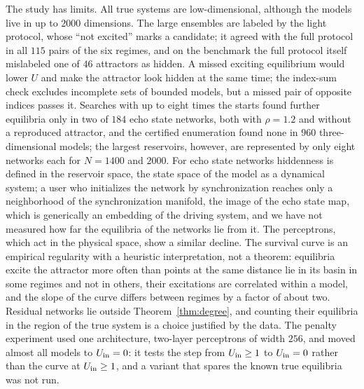 The study has limits. All true systems are low-dimensional, although the models live in up to $2000$ dimensions. The large
ensembles are labeled by the light protocol, whose ``not excited'' marks a candidate; it agreed with the full protocol in all $115$
pairs of the six regimes, and on the benchmark the full protocol itself mislabeled one of $46$ attractors as hidden. A missed exciting
equilibrium would lower $U$ and make the attractor look hidden at the same time; the index-sum check excludes incomplete sets
of bounded models, but a missed pair of opposite indices passes it. Searches with up to eight times the starts found
further equilibria only in two of $184$ echo state networks, both with $\rho=1.2$ and without a reproduced attractor, and
the certified enumeration found none in $960$ three-dimensional models; the largest reservoirs, however, are represented by only eight networks each for $N=1400$
and $2000$. For echo state networks hiddenness is defined in the
reservoir space, the state space of the model as a dynamical system; a user who initializes the network by synchronization
reaches only a neighborhood of the synchronization manifold, the image of the echo state map, which is generically an
embedding of the driving system,\cite{HartHookDawes2020} and we have not measured how far the equilibria of the networks
lie from it. The perceptrons, which act in the physical space, show a similar decline. The survival curve is
an empirical regularity with a heuristic interpretation, not a theorem: equilibria excite the attractor more often than
points at the same distance lie in its basin in some regimes and not in others, their excitations are correlated within a
model, and the slope of the curve differs between regimes by a factor of about two. Residual networks lie outside
Theorem~\ref{thm:degree}, and counting their equilibria in the region of the true system is a choice justified by the data.
The penalty experiment used one architecture, two-layer perceptrons of width $256$, and moved almost all models to
$U_{\mathrm{in}}=0$: it tests the step from $U_{\mathrm{in}}\ge1$ to $U_{\mathrm{in}}=0$ rather than the curve at $U_{\mathrm{in}}\ge1$, and a variant that spares the
known true equilibria was not run.
